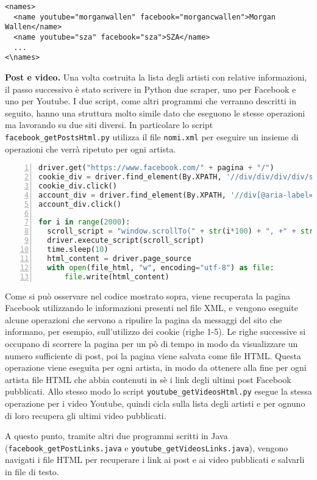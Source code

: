 \documentclass[conference]{IEEEtran}
\newcommand{\mypar}[1]{{\bf #1.}}
\begin{document}
\begin{lstlisting}
<names>
  <name youtube="morganwallen" facebook="morgancwallen">Morgan Wallen</name>
  <name youtube="sza" facebook="sza">SZA</name>
  ...
<\names>
\end{lstlisting}

\mypar{Post e video} Una volta costruita la lista degli artisti con relative informazioni, il passo
successivo è stato scrivere in Python due scraper, uno per Facebook e uno per Youtube. I due script,
come altri programmi che verranno descritti in seguito, hanno una struttura molto simile dato che eseguono
le stesse operazioni ma lavorando su due siti diversi. In particolare lo script \texttt{facebook\_getPostsHtml.py}
utilizza il file \texttt{nomi.xml} per eseguire un insieme di operazioni che verrà ripetuto per ogni artista.

\begin{lstlisting}[language=Python, numbers=left, numberstyle=\tiny]
driver.get("https://www.facebook.com/" + pagina + "/")
cookie_div = driver.find_element(By.XPATH, '//div/div/div/div/span/span[text()="Rifiuta cookie facoltativi"]')
cookie_div.click()
account_div = driver.find_element(By.XPATH, '//div[@aria-label="Chiudi"]')
account_div.click()

for i in range(2000):
  scroll_script = "window.scrollTo(" + str(i*100) + ", +" + str((i+1)*100) + ");"
  driver.execute_script(scroll_script)
  time.sleep(10)
  html_content = driver.page_source
  with open(file_html, "w", encoding="utf-8") as file:
      file.write(html_content)
\end{lstlisting}

Come si può osservare nel codice mostrato sopra, viene recuperata la pagina Facebook utilizzando
le informazioni presenti nel file XML, e vengono eseguite alcune operazioni che servono a ripulire
la pagina da messaggi del sito che informano, per esempio, sull'utilizzo dei cookie (righe 1-5).
Le righe successive si occupano di scorrere la pagina per un pò di tempo in modo da visualizzare un numero
sufficiente di post, poi la pagina viene salvata come file HTML. Questa operazione viene eseguita
per ogni artista, in modo da ottenere alla fine per ogni artista file HTML che abbia contenuti
in sè i link degli ultimi post Facebook pubblicati. Allo stesso modo lo script \texttt{youtube\_getVideosHtml.py}
esegue la stessa operazione per i video Youtube, quindi cicla sulla lista degli artisti e per ognuno
di loro recupera gli ultimi video pubblicati.

A questo punto, tramite altri due programmi scritti in Java (\texttt{facebook\_getPostLinks.java} e
\texttt{youtube\_getVideosLinks.java}), vengono navigati i file HTML per recuperare i link ai post
e ai video pubblicati e salvarli in file di testo.
\end{document}
